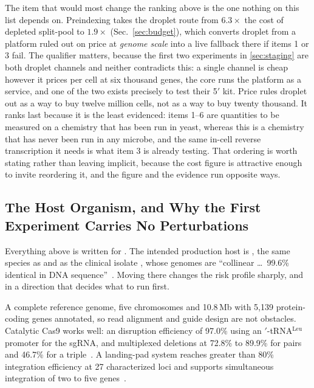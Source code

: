  The item that would
most change the ranking above is the one nothing on this list depends on.
Preindexing takes the droplet route from $6.3\times$ the cost of depleted
split-pool to $1.9\times$ (Sec.~\ref{sec:budget}), which converts droplet from a
platform ruled out on price at \emph{genome scale} into a live fallback there if
items 1 or 3 fail. The qualifier matters, because the first two experiments in
\cref{sec:staging} are both droplet channels and neither contradicts this: a
single channel is cheap however it prices per cell at six thousand genes, the
core runs the platform as a service, and one of the two exists precisely to test
their 5$'$ kit. Price rules droplet out as a way to buy twelve million cells, not
as a way to buy twenty thousand.
It ranks last because it is the least evidenced: items 1--6 are quantities to be
measured on a chemistry that has been run in yeast, whereas this is a chemistry
that has never been run in any microbe, and the same in-cell reverse
transcription it needs is what item 3 is already testing. That ordering is worth
stating rather than leaving implicit, because the cost figure is attractive
enough to invite reordering it, and the figure and the evidence run opposite
ways.

\subsection{The Host Organism, and Why the First Experiment Carries No
Perturbations}
\label{sec:host}

Everything above is written for . The intended production
host is , the same species as  and as the clinical isolate , whose genomes are
``collinear \dots\ 99.6\% identical in DNA
sequence''~\citep{douglassPopulationGenomicsCandida2018}. Moving there changes
the risk profile sharply, and in a direction that decides what to run first.

 A complete reference genome, five chromosomes and
10.8\,Mb with 5{,}139 protein-coding genes annotated, so read alignment and
guide design are not obstacles. Catalytic Cas9 works well: an 
disruption efficiency of 97.0\% using an $'$-tRNA$^{\text{Leu}}$
promoter for the sgRNA, and multiplexed deletions at 72.8\% to 89.9\% for pairs
and 46.7\% for a triple~\citep{tranDevelopmentCRISPRCas9Based2019}. A landing-pad
system reaches greater than 80\% integration efficiency at 27 characterized loci
and supports simultaneous integration of two to five
genes~\citep{fatmaLandingPadSystem2023}.

